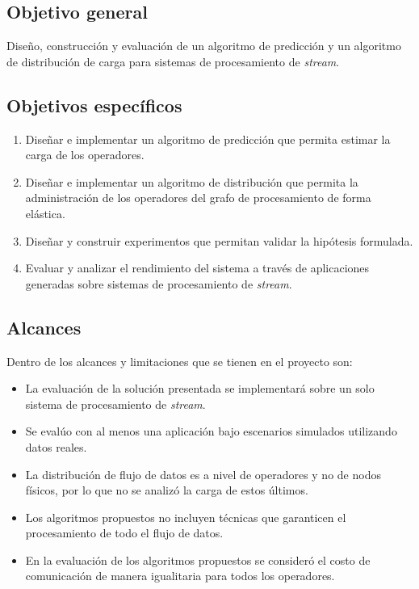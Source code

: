 \subsection{Objetivo general}
	Dise\~no, construcción y evaluaci\'on de un algoritmo de predicci\'on y un algoritmo de distribuci\'on de carga para sistemas de procesamiento de \textit{stream}.

\subsection{Objetivos específicos}
\begin{enumerate}
	\item Dise\~nar e implementar un algoritmo de predicci\'on que permita estimar la carga de los operadores.
	\item Dise\~nar e implementar un algoritmo de distribuci\'on que permita la administraci\'on de los operadores del grafo de procesamiento de forma el\'astica.
	\item Dise\~nar y construir experimentos que permitan validar la hip\'otesis formulada.
	\item Evaluar y analizar el rendimiento del sistema a trav\'es de aplicaciones generadas sobre sistemas de procesamiento de \textit{stream}.
\end{enumerate}

\subsection{Alcances}
Dentro de los alcances y limitaciones que se tienen en el proyecto son:
\begin{itemize}
	\item La evaluación de la solución presentada se implementará sobre un solo sistema de procesamiento de \textit{stream}.
	\item Se evalúo con al menos una aplicación bajo escenarios simulados utilizando datos reales.
	\item La distribución de flujo de datos es a nivel de operadores y no de nodos f\'isicos, por lo que no se analizó la carga de estos \'ultimos.
	\item Los algoritmos propuestos no incluyen t\'ecnicas que garanticen el procesamiento de todo el flujo de datos.
	\item En la evaluación de los algoritmos propuestos se consideró el costo de comunicación de manera igualitaria para todos los operadores.
\end{itemize}


